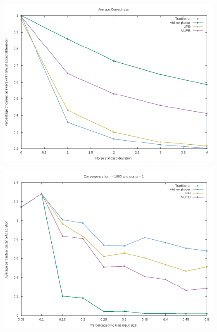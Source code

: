 \documentclass[12pt]{article}
\begin{document}
\begin{figure}[H]
        \centering
        \includegraphics[scale=.5]{correctness_plot_result}
\end{figure}
\begin{figure}[H]
        \centering
        \includegraphics[scale=.5]{convergence_plot_n1000_s1}
\end{figure}
\end{document}
